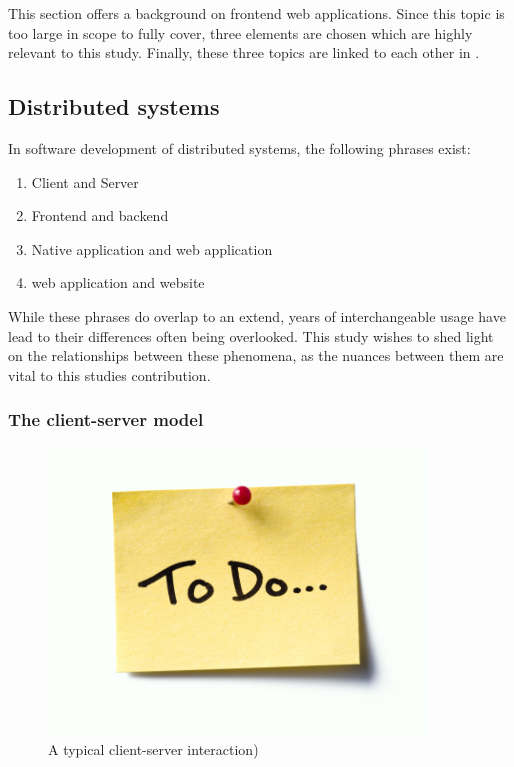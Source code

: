 This section offers a background on frontend web applications.
Since this topic is too large in scope to fully cover, three elements are chosen which are highly relevant to this study.
Finally, these three topics are linked to each other in .

\subsection{Distributed systems}
\label{sec:background-web-terminology}

In software development of distributed systems, the following phrases exist: 
\begin{enumerate}[-]
  \item Client and Server 
  \item Frontend and backend
  \item Native application and web application
  \item web application and website
\end{enumerate}
While these phrases do overlap to an extend, years of interchangeable usage have lead to their differences often being overlooked. 
This study wishes to shed light on the relationships between these phenomena, as the nuances between them are vital to this studies contribution.

\subsubsection*{The client-server model}

\begin{figure}
  \centering
  \graphicspath{ {../../assets/images/misc/} }
  \includegraphics[width=380px]{todo.jpg}
  \caption{A typical client-server interaction) }
  \label{fig:client-server}
\end{figure}

